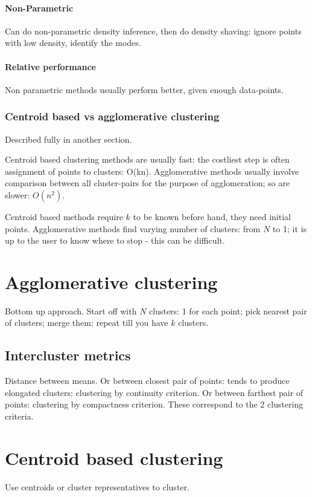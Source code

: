 \documentclass[oneside, article]{memoir}
\begin{document}
\paragraph*{Non-Parametric}
Can do non-parametric density inference, then do density shaving: ignore points with low density, identify the modes.

\paragraph*{Relative performance}
Non parametric methods usually perform better, given enough data-points.

\subsubsection{Centroid based vs agglomerative clustering}
Described fully in another section.

Centroid based clustering methods are usually fast: the costliest step is often assignment of points to clusters: O(kn). Agglomerative methods usually involve comparison between all cluster-pairs for the purpose of agglomeration; so are slower: $O(n^{2})$.

Centroid based methods require $k$ to be known before hand, they need initial points. Agglomerative methods find varying number of clusters: from $N$ to 1; it is up to the user to know where to stop - this can be difficult.

\section{Agglomerative clustering}
Bottom up approach. Start off with $N$ clusters: 1 for each point; pick nearest pair of clusters; merge them; repeat till you have $k$ clusters.

\subsection{Intercluster metrics}
Distance between means. Or between closest pair of points: tends to produce elongated clusters: clustering by continuity criterion. Or between farthest pair of points: clustering by compactness criterion. These correspond to the 2 clustering criteria.

\section{Centroid based clustering}
Use centroids or cluster representatives to cluster.
\end{document}
